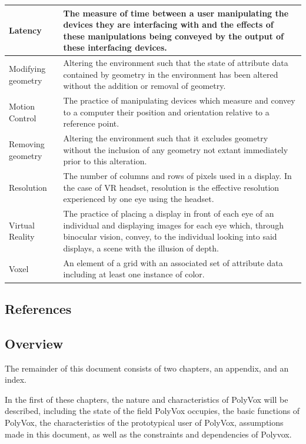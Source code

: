\documentclass[onecolumn, draftclsnofoot,10pt, compsoc]{IEEEtran}
\begin{document}
\begin{longtable}{ | l | p{12cm} | }
Latency & The measure of time between a user manipulating the devices they are interfacing with and the effects of these manipulations being conveyed by the output of these interfacing devices. \\ \hline
Modifying geometry & Altering the environment such that the state of attribute data contained by geometry in the environment has been altered without the addition or removal of geometry.  \\ \hline
Motion Control & The practice of manipulating devices which measure and convey to a computer their position and orientation relative to a reference point.  \\ \hline
Removing geometry & Altering the environment such that it excludes geometry without the inclusion of any geometry not extant immediately prior to this alteration.  \\ \hline
Resolution & The number of columns and rows of pixels used in a display. In the case of  VR headset, resolution is the effective resolution experienced by one eye using the headset. \\ \hline
Virtual Reality & The practice of placing a display in front of each eye of an individual and displaying images for each eye which, through binocular vision, convey, to the individual looking into said displays, a scene with the illusion of depth.  \\ \hline
Voxel & An element of a grid with an associated set of attribute data including at least one instance of color.  \\ \hline
 
\hline 
\end{longtable}
\subsection{References}

{}
\subsection{Overview}
The remainder of this document consists of two chapters, an appendix, and an index.

In the first of these chapters, the nature and characteristics of PolyVox will be described, including the state of the field PolyVox occupies, the basic functions of PolyVox, the characteristics of the prototypical user of PolyVox, assumptions made in this document, as well as the constraints and dependencies of Polyvox.
\end{document}
